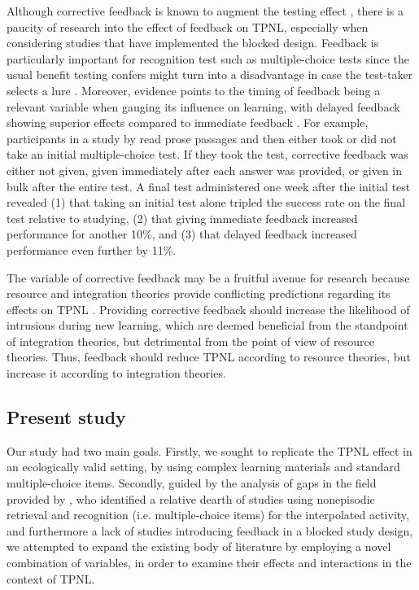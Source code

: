 \documentclass[../main.tex]{subfiles}
\begin{document}
Although corrective feedback is known to augment the testing effect \citep{roedigeriiiCriticalRoleRetrieval2011}, there is a paucity of research into the effect of feedback on TPNL, especially when considering studies that have implemented the  blocked design. Feedback is particularly important for recognition test such as multiple-choice tests since the usual benefit testing confers might turn into a disadvantage in case the test-taker selects a lure \citep{roedigerPositiveNegativeConsequences2005, marshMemorialConsequencesMultiplechoice2007}. Moreover, evidence points to the timing of feedback being a relevant variable when gauging its influence on learning, with delayed feedback showing superior effects compared to immediate feedback \citep{metcalfeDelayedImmediateFeedback2009,butlerEffectTypeTiming2007, butlerFeedbackEnhancesPositive2008,smithLearningFeedbackSpacing2010}. For example, participants in a study by \cite{butlerFeedbackEnhancesPositive2008} read prose passages and then either took or did not take an initial multiple-choice test. If they took the test, corrective feedback was either not given, given immediately after each answer was provided, or given in bulk after the entire test. A final test administered one week after the initial test revealed (1) that taking an initial test alone tripled the success rate on the final test relative to studying, (2) that giving immediate feedback increased performance for another 10\%, and (3) that delayed feedback increased performance even further by 11\%.

The variable of corrective feedback may be a fruitful avenue for research because resource and integration theories provide conflicting predictions regarding its effects on TPNL \citep{chanRetrievalPotentiatesNew2018}. Providing corrective feedback should increase the likelihood of intrusions during new learning, which are deemed beneficial from the standpoint of integration theories, but detrimental from the point of view of resource theories. Thus, feedback should reduce TPNL according to resource theories, but increase it according to integration theories.


\subsection{Present study\label{present}}

Our study had two main goals. Firstly, we sought to replicate the TPNL effect in
an ecologically valid setting, by using complex learning materials and standard
multiple-choice items. Secondly, guided by the analysis of gaps in the field
provided by \cite{chanRetrievalPotentiatesNew2018}, who identified a relative
dearth of studies using nonepisodic retrieval and recognition (i.e.
multiple-choice items) for the interpolated activity, and furthermore a lack of
studies introducing feedback in a blocked study design, we attempted to expand
the existing body of literature by employing a novel combination of variables,
in order to examine their effects and interactions in the context of TPNL.
\end{document}
